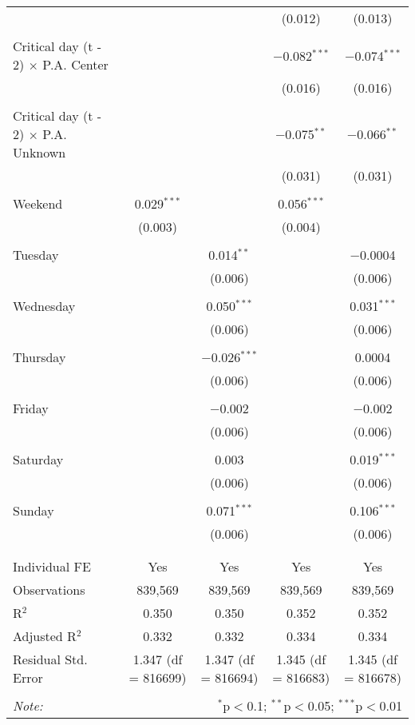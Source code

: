 \documentclass[
]{article}
\begin{document}
\begin{table}[!htbp]
{\begin{tabular}{@{\extracolsep{5pt}}lcccc}
  &  &  & (0.012) & (0.013) \\ 
  & & & & \\ 
 Critical day (t - 2) $\times$ P.A. Center &  &  & $-$0.082$^{***}$ & $-$0.074$^{***}$ \\ 
  &  &  & (0.016) & (0.016) \\ 
  & & & & \\ 
 Critical day (t - 2) $\times$ P.A. Unknown &  &  & $-$0.075$^{**}$ & $-$0.066$^{**}$ \\ 
  &  &  & (0.031) & (0.031) \\ 
  & & & & \\ 
 Weekend & 0.029$^{***}$ &  & 0.056$^{***}$ &  \\ 
  & (0.003) &  & (0.004) &  \\ 
  & & & & \\ 
 Tuesday &  & 0.014$^{**}$ &  & $-$0.0004 \\ 
  &  & (0.006) &  & (0.006) \\ 
  & & & & \\ 
 Wednesday &  & 0.050$^{***}$ &  & 0.031$^{***}$ \\ 
  &  & (0.006) &  & (0.006) \\ 
  & & & & \\ 
 Thursday &  & $-$0.026$^{***}$ &  & 0.0004 \\ 
  &  & (0.006) &  & (0.006) \\ 
  & & & & \\ 
 Friday &  & $-$0.002 &  & $-$0.002 \\ 
  &  & (0.006) &  & (0.006) \\ 
  & & & & \\ 
 Saturday &  & 0.003 &  & 0.019$^{***}$ \\ 
  &  & (0.006) &  & (0.006) \\ 
  & & & & \\ 
 Sunday &  & 0.071$^{***}$ &  & 0.106$^{***}$ \\ 
  &  & (0.006) &  & (0.006) \\ 
  & & & & \\ 
\hline \\[-1.8ex] 
Individual FE & Yes & Yes & Yes & Yes \\ 
Observations & 839,569 & 839,569 & 839,569 & 839,569 \\ 
R$^{2}$ & 0.350 & 0.350 & 0.352 & 0.352 \\ 
Adjusted R$^{2}$ & 0.332 & 0.332 & 0.334 & 0.334 \\ 
Residual Std. Error & 1.347 (df = 816699) & 1.347 (df = 816694) & 1.345 (df = 816683) & 1.345 (df = 816678) \\ 
\hline 
\hline \\[-1.8ex] 
\textit{Note:}  & \multicolumn{4}{r}{$^{*}$p$<$0.1; $^{**}$p$<$0.05; $^{***}$p$<$0.01} \\ 
\end{tabular}
} 
\end{table} 
\newpage
\end{document}
